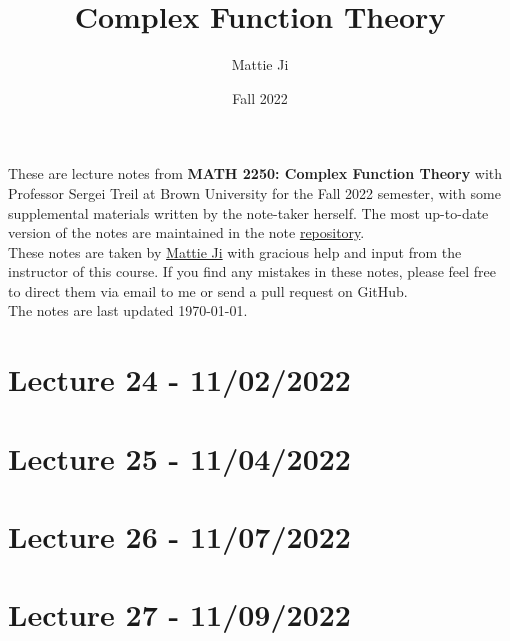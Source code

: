 \documentclass{article}
\title{Complex Function Theory}
\author{Mattie Ji}
\date{Fall 2022}
\begin{document}
\maketitle
These are lecture notes from \textbf{MATH 2250: Complex Function Theory} with Professor Sergei Treil at Brown University for the Fall 2022 semester, with some supplemental materials written by the note-taker herself. The most up-to-date version of the notes are maintained in the note \href{https://github.com/maroon-scorch/MATH2550-notes}{repository}.\\

These notes are taken by \href{https://github.com/maroon-scorch}{Mattie Ji} with gracious help and input from the instructor of this course. If you find any mistakes in these notes, please feel free to direct them via email to me or send a pull request on GitHub.\\

The notes are last updated \today.
\tableofcontents
\newpage


























\section{Lecture 24 - 11/02/2022}

\section{Lecture 25 - 11/04/2022}

\section{Lecture 26 - 11/07/2022}

\section{Lecture 27 - 11/09/2022}
\end{document}
